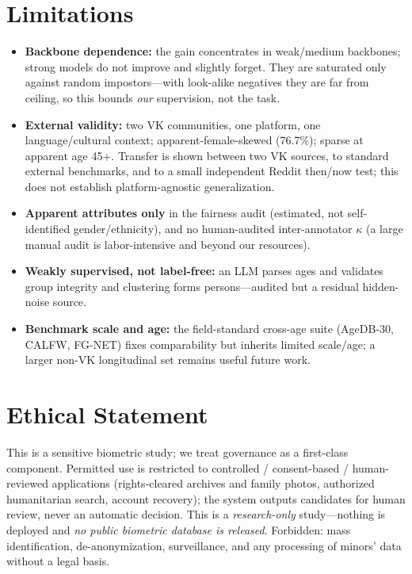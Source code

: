 \documentclass[letterpaper]{article} %
\begin{document}
\section{Limitations}\label{sec:limitations}
\begin{itemize}
\item \textbf{Backbone dependence:} the gain concentrates in weak/medium backbones; strong models do not improve and slightly forget. They are saturated only against random impostors---with look-alike negatives they are far from ceiling, so this bounds \emph{our} supervision, not the task.
\item \textbf{External validity:} two VK communities, one platform, one language/cultural context; apparent-female-skewed (76.7\%); sparse at apparent age 45+. Transfer is shown between two VK sources, to standard external benchmarks, and to a small independent Reddit then/now test; this does not establish platform-agnostic generalization.
\item \textbf{Apparent attributes only} in the fairness audit (estimated, not self-identified gender/ethnicity), and no human-audited inter-annotator $\kappa$ (a large manual audit is labor-intensive and beyond our resources).
\item \textbf{Weakly supervised, not label-free:} an LLM parses ages and validates group integrity and clustering forms persons---audited but a residual hidden-noise source.
\item \textbf{Benchmark scale and age:} the field-standard cross-age suite (AgeDB-30, CALFW, FG-NET) fixes comparability but inherits limited scale/age; a larger non-VK longitudinal set remains useful future work.
\end{itemize}

\section*{Ethical Statement}
This is a sensitive biometric study; we treat governance as a first-class component. Permitted use is restricted to controlled / consent-based / human-reviewed applications (rights-cleared archives and family photos, authorized humanitarian search, account recovery); the system outputs candidates for human review, never an automatic decision. This is a \emph{research-only} study---nothing is deployed and \emph{no public biometric database is released}. Forbidden: mass identification, de-anonymization, surveillance, and any processing of minors' data without a legal basis.
\end{document}
